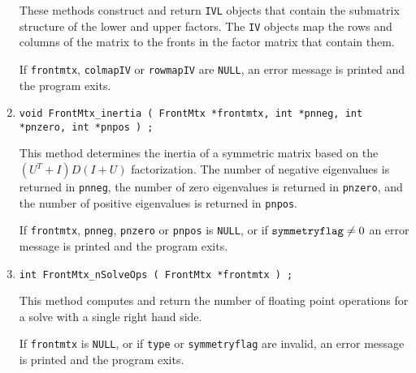 \begin{enumerate}
These methods construct and return {\tt IVL} objects that 
contain the submatrix structure of the lower and upper factors.
The {\tt IV} objects map the rows and columns of the matrix to the
fronts in the factor matrix that contain them.
\par {}
If {\tt frontmtx}, {\tt colmapIV} or {\tt rowmapIV} are {\tt NULL}, 
an error message is printed and the program exits.
\item
\begin{verbatim}
void FrontMtx_inertia ( FrontMtx *frontmtx, int *pnneg, int *pnzero, int *pnpos ) ;
\end{verbatim}
This method determines the inertia of a symmetric matrix
based on the $(U^T + I)D(I + U)$ factorization.
The number of negative eigenvalues is returned in {\tt *pnneg},
the number of zero eigenvalues is returned in {\tt *pnzero},
and the number of positive eigenvalues is returned in {\tt *pnpos}.
\par {}
If {\tt frontmtx}, {\tt pnneg}, {\tt pnzero} 
or {\tt pnpos} is {\tt NULL}, 
or if ${\tt symmetryflag} \ne 0$
an error message is printed and the program exits.
\item
\begin{verbatim}
int FrontMtx_nSolveOps ( FrontMtx *frontmtx ) ;
\end{verbatim}
This method computes and return the number of floating point
operations for a solve with a single right hand side.
\par {}
If {\tt frontmtx} is {\tt NULL}, 
or if {\tt type} or {\tt symmetryflag} are invalid,
an error message is printed and the program exits.
\end{enumerate}
\par
